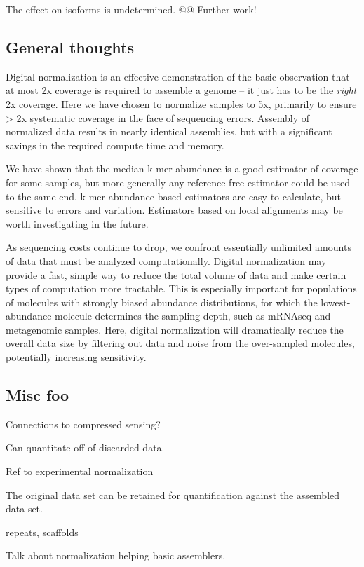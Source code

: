 \documentclass[10pt]{article}
\begin{document}
The effect on isoforms is undetermined.  @@  Further work!

\subsection{General thoughts}

Digital normalization is an effective demonstration of the basic
observation that at most 2x coverage is required to assemble a genome
-- it just has to be the {\em right} 2x coverage.  Here we have chosen
to normalize samples to 5x, primarily to ensure > 2x systematic
coverage in the face of sequencing errors.  Assembly of normalized
data results in nearly identical assemblies, but with a significant
savings in the required compute time and memory.

We have shown that the median k-mer abundance is a good estimator of
coverage for some samples, but more generally any reference-free
estimator could be used to the same end.  k-mer-abundance based
estimators are easy to calculate, but sensitive to errors and
variation.  Estimators based on local alignments may be worth
investigating in the future.

As sequencing costs continue to drop, we confront essentially
unlimited amounts of data that must be analyzed computationally.
Digital normalization may provide a fast, simple way to reduce the
total volume of data and make certain types of computation more
tractable.  This is especially important for populations of molecules
with strongly biased abundance distributions, for which the
lowest-abundance molecule determines the sampling depth, such as
mRNAseq and metagenomic samples.  Here, digital normalization will
dramatically reduce the overall data size by filtering out data and
noise from the over-sampled molecules, potentially increasing
sensitivity.

\subsection{Misc foo}

Connections to compressed sensing?

Can quantitate off of discarded data.

Ref to experimental normalization

The original data set can be retained for quantification against the
assembled data set.

repeats, scaffolds

Talk about normalization helping basic assemblers.
\end{document}
